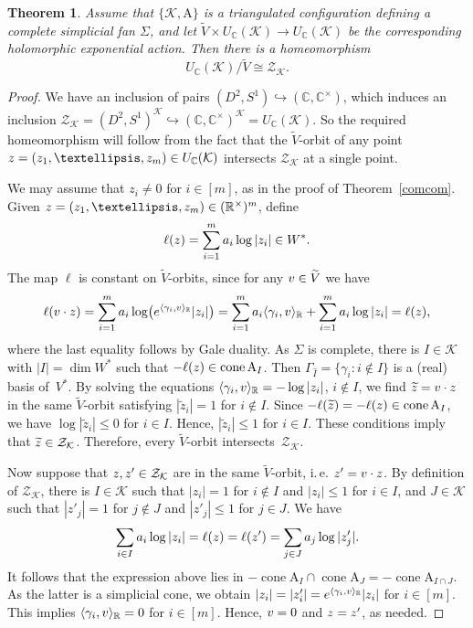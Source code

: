 \documentclass[a4paper]{amsart}
\newtheorem{theorem}{Theorem}[section]
\theoremstyle{definition}
\theoremstyle{remark}
\numberwithin{equation}{section}
\def\R{\mathbb R}
\def\C{\mathbb C}
\def\R{\mathbb R}
\def\sK{\mathcal K}
\newcommand{\mb}[1]{{\textbf {\textit#1}}}
\renewcommand{\le}{\leqslant}
\def\cone{\mathop{\mathrm{cone}}}
\newcommand{\zk}{\mathcal Z_{\mathcal K}}
\newcommand{\<}{\langle}
\renewcommand{\>}{\rangle}
\begin{document}
\begin{theorem}\label{quotzk}
Assume that $\{\sK,\mathrm A\}$ is a triangulated configuration defining a complete simplicial fan $\Sigma$, and let $\widetilde V\times U_\C(\sK)\to U_\C(\sK)$ be the corresponding holomorphic exponential action. Then there is a homeomorphism 
\[
  U_\C(\sK)/\widetilde V\cong\zk.
\]
\end{theorem}
\begin{proof}
We have an inclusion of pairs $(D^2,S^1)\hookrightarrow(\C,\C^\times)$, which induces an inclusion 
$\zk=(D^2,S^1)^\sK\hookrightarrow(\C,\C^\times)^\sK=U_\C(\sK)$. So the required homeomorphism will follow from the fact that the $\widetilde V$-orbit of any point $\mb z=(z_1,\ldots,z_m)\in U_\C(\sK)$ intersects $\zk$ at a single point.

We may assume that $z_i\ne0$ for $i\in[m]$, as in the proof of Theorem~\ref{comcom}. Given $\mb z=(z_1,\ldots,z_m)\in(\R^\times)^m$, define 
\[
  \ell(\mb z)=\sum_{i=1}^m\mb a_i\log|z_i|\in W^*.
\]
The map $\ell$ is constant on $\widetilde V$-orbits, since for any $\mb v\in\widetilde V$ we have
\[
  \ell(\mb v\cdot\mb z)=\sum_{i=1}^m\mb a_i
  \log\bigl(e^{\langle\gamma_i,\mb v\rangle_\R}|z_i|\bigr)=
  \sum_{i=1}^m\mb a_i\langle\gamma_i,\mb v\rangle_\R+
  \sum_{i=1}^m\mb a_i\log|z_i|=\ell(\mb z),
\]
where the last equality follows by Gale duality.
As $\Sigma$ is complete, there is $I\in\sK$ with $|I|=\dim W^*$ such 
that $-\ell(\mb z)\in\cone\mathrm A_I$. Then $\Gamma_{\widehat I}=\{\gamma_i\colon i\notin I\}$ is a (real) basis of~$V^*$. By solving the equations 
$\langle \gamma_i ,\mb v\rangle_\R = -\log|z_i|$, $i \notin I$, we find 
$\widetilde{\mb z}=\mb v\cdot\mb z$ in the same $\widetilde V$-orbit satisfying 
$|\widetilde z_i|=1$ for $i\notin I$. Since $-\ell(\widetilde{\mb z})=-\ell(\mb z)\in\cone\mathrm A_I$, we have $\log|\widetilde z_i|\le0$ for $i\in I$. Hence, 
$|\widetilde z_i|\le1$ for $i\in I$. These conditions imply that $\widetilde{\mb z}\in\zk$. Therefore, every $\widetilde V$-orbit intersects~$\zk$.

Now suppose that $\mb z,\mb z'\in\zk$ are in the same $\widetilde V$-orbit, i.\,e. 
$\mb z'=\mb v\cdot\mb z$. By definition of 
$\zk$, there is $I\in\sK$ such that $|z_i|=1$ for $i\notin I$ and $|z_i|\le1$ for $i\in I$, and $J\in\sK$ such that 
$|z'_j|=1$ for $j\notin J$ and $|z'_j|\le1$ for $j\in J$. We have
\[
  \sum_{i\in I}\mb a_i\log|z_i|=\ell(\mb z)=\ell(\mb z')=
  \sum_{j\in J}\mb a_j\log|z'_j|. 
\]
It follows that the expression above lies in $-\cone\mathrm A_I\cap\cone\mathrm A_J=-\cone\mathrm A_{I\cap J}$. As the latter is a simplicial cone, we obtain $|z_i|=|z'_i|=e^{\langle\gamma_i,\mb v\rangle_\R}|z_i|$ for $i\in[m]$. This implies $\langle\gamma_i,\mb v\rangle_\R=0$ for $i\in[m]$. Hence, $\mb v=0$ and 
$\mb z=\mb z'$, as needed.
\end{proof}
\end{document}
